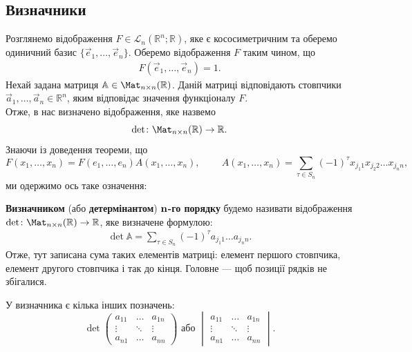 \documentclass{math_library}
\begin{document}
\subsection{Визначники}
Розглянемо відображення $F \in \mathcal{L}_n(\mathbb{R}^n;\mathbb{R})$, яке є кососиметричним та оберемо одиничний базис $\{\vec{e}_1,\dots,\vec{e}_n\}$. Оберемо відображення $F$ таким чином, що
\begin{align*}
F(\vec{e}_1,\dots,\vec{e}_n) = 1.
\end{align*}
Нехай задана матриця $\mathbb{A} \in \Mat_{n \times n}(\mathbb{R})$. Даній матриці відповідають стовпчики $\vec{a}_1,\dots,\vec{a}_n \in \mathbb{R}^n$, яким відповідає значення функціоналу $F$.\\
Отже, в нас визначено відображення, яке назвемо
\[
\det \colon \Mat_{n \times n}(\mathbb{R}) \to \mathbb{R}.
\]
Знаючи із доведення теореми, що
\[
F(x_1,\dots,x_n) = F(e_1,\dots,e_n) A(x_1,\dots,x_n),\ \qquad A(x_1,\dots,x_n) = \sum_{\tau \in S_n} (-1)^\tau x_{j_1 1} x_{j_2 2} \dots x_{j_n n},
\]
ми одержимо ось таке означення:

\begin{definition}
\textbf{Визначником} (або \textbf{детермінантом}) \textbf{$\bf{n}$-го порядку} будемо називати відображення $\det \colon \Mat_{n \times n}(\mathbb{R}) \to \mathbb{R}$, яке визначене формулою:
\begin{align*}
\det \mathbb{A} = \displaystyle \sum_{\tau \in S_n} (-1)^{\tau} a_{j_1 1}\dots a_{j_n n}.
\end{align*}
Отже, тут записана сума таких елементів матриці: елемент першого стовпчика, елемент другого стовпчика і так до кінця. Головне --- щоб позиції рядків не збігалися.
\end{definition}

\noindent
У визначника є кілька інших позначень:
\[
\det \begin{pmatrix}
a_{11} & \dots & a_{1n} \\
 \vdots & \ddots &\vdots \\
 a_{n1} & \dots & a_{nn}
\end{pmatrix} \text{ або } \begin{vmatrix}
a_{11} & \dots & a_{1n} \\
 \vdots & \ddots &\vdots \\
 a_{n1} & \dots & a_{nn}
\end{vmatrix}.
\]
\end{document}
